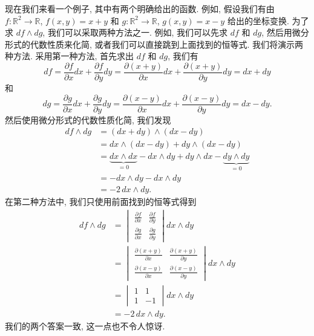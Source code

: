 现在我们来看一个例子, 其中有两个明确给出的函数. 例如, 假设我们有由 $f:\mathbb{R}^2\to\mathbb{R}$, $f(x,y)=x+y$ 和 $g:\mathbb{R}^2\to\mathbb{R}$, $g(x,y)=x-y$ 给出的坐标变换. 为了求 $df\wedge dg$, 我们可以采取两种方法之一. 例如, 我们可以先求 $df$ 和 $dg$, 然后用微分形式的代数性质来化简, 或者我们可以直接跳到上面找到的恒等式. 我们将演示两种方法. 采用第一种方法, 首先求出 $df$ 和 $dg$, 我们有
\[
df=\frac{\partial f}{\partial x}dx+\frac{\partial f}{\partial y}dy
=\frac{\partial(x+y)}{\partial x}dx+\frac{\partial(x+y)}{\partial y}dy=dx+dy
\]
和
\[
dg=\frac{\partial g}{\partial x}dx+\frac{\partial g}{\partial y}dy
=\frac{\partial(x-y)}{\partial x}dx+\frac{\partial(x-y)}{\partial y}dy=dx-dy.
\]
然后使用微分形式的代数性质化简, 我们发现
\begin{align*}
df\wedge dg&=(dx+dy)\wedge(dx-dy)\\
&=dx\wedge(dx-dy)+dy\wedge(dx-dy)\\
&=\underbrace{dx\wedge dx}_{=0}-dx\wedge dy+dy\wedge dx-\underbrace{dy\wedge dy}_{=0}\\
&=-dx\wedge dy-dx\wedge dy\\
&=-2\,dx\wedge dy.
\end{align*}
在第二种方法中, 我们只使用前面找到的恒等式得到
\begin{align*}
df\wedge dg&=\begin{vmatrix}\frac{\partial f}{\partial x}&\frac{\partial f}{\partial y}\\[4pt]\frac{\partial g}{\partial x}&\frac{\partial g}{\partial y}\end{vmatrix}dx\wedge dy\\
&=\begin{vmatrix}\frac{\partial(x+y)}{\partial x}&\frac{\partial(x+y)}{\partial y}\\[4pt]\frac{\partial(x-y)}{\partial x}&\frac{\partial(x-y)}{\partial y}\end{vmatrix}dx\wedge dy\\
&=\begin{vmatrix}1&1\\1&-1\end{vmatrix}dx\wedge dy\\
&=-2\,dx\wedge dy.
\end{align*}
我们的两个答案一致, 这一点也不令人惊讶.

